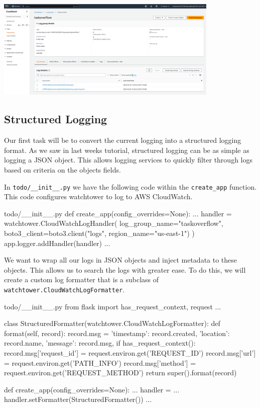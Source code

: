 \documentclass{csse4400}
\begin{document}
\begin{center}
\includegraphics[width=0.8\textwidth]{images/log-group}
\end{center}

\subsection{Structured Logging}

Our first task will be to convert the current logging into a structured logging format.
As we saw in last weeks tutorial, structured logging can be as simple as logging a JSON object.
This allows logging services to quickly filter through logs based on criteria on the objects fields.

In \texttt{todo/\_\_init\_\_.py} we have the following code within the \texttt{create\_app} function.
This code configures watchtower to log to AWS CloudWatch.

\begin{code}[language=python,numbers=none]{todo/\_\_init\_\_.py}
def create_app(config_overrides=None): 
    ...
    handler = watchtower.CloudWatchLogHandler(
        log_group_name="taskoverflow",
        boto3_client=boto3.client("logs", region_name="us-east-1")
    )
    app.logger.addHandler(handler)
    ...
\end{code}

We want to wrap all our logs in JSON objects and inject metadata to these objects.
This allows us to search the logs with greater ease.
To do this,
we will create a custom log formatter that is a subclass of \texttt{watchtower.CloudWatchLogFormatter}.

\begin{code}[language=python,numbers=none]{todo/\_\_init\_\_.py}
from flask import has_request_context, request
...

class StructuredFormatter(watchtower.CloudWatchLogFormatter):
    def format(self, record):
        record.msg = {
            'timestamp': record.created,
            'location': record.name,
            'message': record.msg,
        }
        if has_request_context():
            record.msg['request_id'] = request.environ.get('REQUEST_ID')
            record.msg['url'] = request.environ.get('PATH_INFO')
            record.msg['method'] = request.environ.get('REQUEST_METHOD')
        return super().format(record)

def create_app(config_overrides=None): 
    ...
    handler = ...
    handler.setFormatter(StructuredFormatter())
    ...
\end{code}
\end{document}
